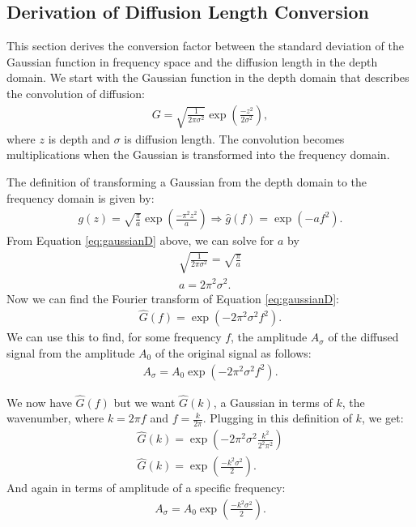 \documentclass[draft, jgrga]{AGUTeX}
\begin{document}
\begin{article}
\section{Derivation of Diffusion Length Conversion}

This section derives the conversion factor between the standard deviation of the Gaussian function in frequency space and the diffusion length in the depth domain. We start with the Gaussian function in the depth domain that describes the convolution of diffusion:
\begin{eqnarray}
  \label{eq:gaussianD}
  G = \sqrt{\frac{1}{2\pi\sigma^{2}}} \exp\left(\frac{-z^{2}}{2\sigma^{2}}\right),
\end{eqnarray}
where $z$ is depth and $\sigma$ is diffusion length. The convolution becomes multiplications when the Gaussian is transformed into the frequency domain.

The definition of transforming a Gaussian from the depth domain to the frequency domain is given by:
\begin{eqnarray}
  g(z) = \sqrt{\frac{\pi}{a}}\exp\left(\frac{-\pi^{2}z^{2}}{a}\right)
  \Rightarrow
  \hat{g}(f) = \exp\left(-af^{2}\right).
\end{eqnarray}
From Equation \ref{eq:gaussianD} above, we can solve for $a$ by
\begin{eqnarray}
  \sqrt{\frac{1}{2\pi\sigma^{2}}} = \sqrt{\frac{\pi}{a}} \\
  a = 2\pi^{2}\sigma^{2}.
\end{eqnarray}
Now we can find the Fourier transform of Equation \ref{eq:gaussianD}:
\begin{eqnarray}
  \label{eq:gaussianF}
  \hat{G}(f) = \exp\left(-2\pi^{2}\sigma^{2}f^{2}\right).
\end{eqnarray}
We can use this to find, for some frequency $f$, the amplitude $A_\sigma$ of the diffused signal from the amplitude $A_0$ of the original signal as follows:
\begin{eqnarray}
  \label{eq:amp1}
  A_\sigma = A_0 \exp \left(-2 \pi^2 \sigma^2 f^2 \right).
\end{eqnarray}

We now have $\hat{G}(f)$ but we want $\hat{G}(k)$, a Gaussian in terms of $k$, the wavenumber, where $k = 2 \pi f$ and $f = \frac{k}{2\pi}$. Plugging in this definition of $k$, we get:
\begin{eqnarray}
  \hat{G}(k) = \exp\left(-2\pi^{2}\sigma^{2}\frac{k^{2}}{2^{2}\pi^{2}}\right)\\
  \hat{G}(k) = \exp\left(\frac{-k^{2}\sigma^{2}}{2}\right).
\end{eqnarray}
And again in terms of amplitude of a specific frequency:
\begin{eqnarray}
  \label{eq:amp2}
  A_\sigma = A_0 \exp \left(\frac{-k^2\sigma^2}{2}\right).
\end{eqnarray}


\end{article}
\end{document}
